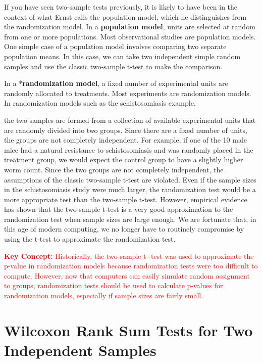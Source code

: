 \documentclass[
]{report}
\theoremstyle{definition}
\theoremstyle{definition}
\theoremstyle{definition}
\theoremstyle{definition}
\theoremstyle{remark}
\begin{document}
If you have seen two-sample tests previously, it is likely to have been in the context of what Ernst calls the population model, which he distinguishes from the randomization model. In a \textbf{population model}, units are selected at random from one or more populations. Most observational studies are population models. One simple case of a population model involves comparing two separate population means. In this case, we can take two independent simple random samples and use the classic two-sample t-test to make the comparison.

In a *\textbf{randomization model}, a fixed number of experimental units are randomly allocated to treatments. Most experiments are randomization models. In randomization models such as the schistosomiasis example,

the two samples are formed from a collection of available experimental units that are randomly divided into two groups. Since there are a fixed number of units, the groups are not completely independent. For example,
if one of the 10 male mice had a natural resistance to schistosomiasis and was randomly placed in the treatment group, we would expect the control group to have a slightly higher worm count. Since the two groups are not completely independent, the assumptions of the classic two-sample t-test are violated. Even if the sample sizes in the schistosomiasis study were much larger, the randomization test would be a more appropriate test than the two-sample t-test. However, empirical evidence has shown that the two-sample t-test is a very good approximation to the randomization test when sample sizes are large enough. We are fortunate that, in this age of modern computing, we no longer have to routinely compromise by using the t-test to approximate the randomization test.

\Large

\textbf{\textcolor{red}{Key Concept:}}
\textcolor{red}{Historically, the two-sample t -test was used to approximate the p-value in randomization models because randomization tests were too difficult to compute. However, now that computers can easily simulate random assignment to groups, randomization tests should be used to calculate p-values for randomization models, especially if sample sizes are fairly small.}

\normalsize

\hypertarget{wilcoxon-rank-sum-tests-for-two-independent-samples}{%
\section{\texorpdfstring{\textbf{Wilcoxon Rank Sum Tests for Two Independent Samples}}{Wilcoxon Rank Sum Tests for Two Independent Samples}}\label{wilcoxon-rank-sum-tests-for-two-independent-samples}}
\end{document}
